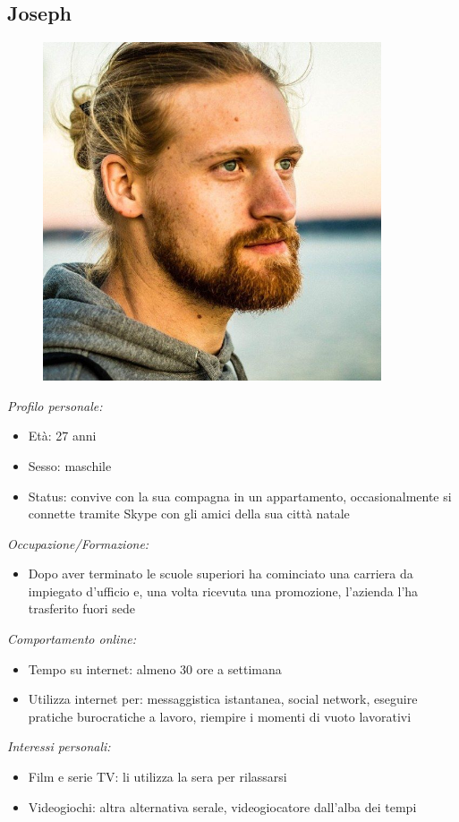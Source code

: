 \subsection{Joseph}
\begin{figure}[H]
    \centering
    \includegraphics[width=100mm]{img/personas/joseph.jpg}
    \label{fig:personas_joseph}
\end{figure}
\textit{Profilo personale:}
\begin{itemize}
    \item Età: 27 anni
    \item Sesso: maschile
    \item Status: convive con la sua compagna in un appartamento, occasionalmente si connette tramite Skype con gli amici della sua città natale
\end{itemize}
\textit{Occupazione/Formazione:}
\begin{itemize}
    \item Dopo aver terminato le scuole superiori ha cominciato una carriera da impiegato d'ufficio e, una volta ricevuta una promozione, l'azienda l'ha trasferito fuori sede
\end{itemize}
\textit{Comportamento online:}
\begin{itemize}
    \item Tempo su internet: almeno 30 ore a settimana
    \item Utilizza internet per: messaggistica istantanea, social network, eseguire pratiche burocratiche a lavoro, riempire i momenti di vuoto lavorativi
\end{itemize}
\textit{Interessi personali:}
\begin{itemize}
    \item Film e serie TV: li utilizza la sera per rilassarsi
    \item Videogiochi: altra alternativa serale, videogiocatore dall'alba dei tempi
\end{itemize}